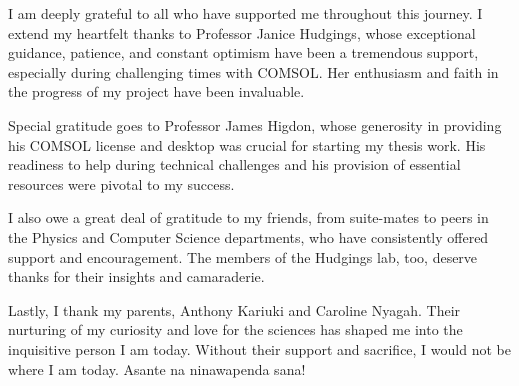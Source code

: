 I am deeply grateful to all who have supported me throughout this journey. I extend my heartfelt thanks to Professor Janice Hudgings, whose exceptional guidance, patience, and constant optimism have been a tremendous support, especially during challenging times with COMSOL. Her enthusiasm and faith in the progress of my project have been invaluable.

Special gratitude goes to Professor James Higdon, whose generosity in providing his COMSOL license and desktop was crucial for starting my thesis work. His readiness to help during technical challenges and his provision of essential resources were pivotal to my success.

I also owe a great deal of gratitude to my friends, from suite-mates to peers in the Physics and Computer Science departments, who have consistently offered support and encouragement. The members of the Hudgings lab, too, deserve thanks for their insights and camaraderie.

Lastly, I thank my parents, Anthony Kariuki and Caroline Nyagah. Their nurturing of my curiosity and love for the sciences has shaped me into the inquisitive person I am today. Without their support and sacrifice, I would not be where I am today. Asante na ninawapenda sana!
